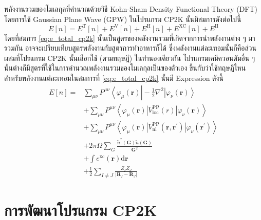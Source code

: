 พลังงานรวมของโมเลกุลที่คำนวณด้วยวิธี Kohn-Sham Density Functional Theory (DFT) โดยการใช้ Gaussian Plane Wave (GPW) ในโปรแกรม CP2K นั้นมีสมการดังต่อไปนี้
%
\begin{equation} 
    \label{eq:e_total_cp2k}
    E[n] 
    = 
    E^{\mathrm{T}}[n]
    + E^{\mathrm{V}}[n] 
    + E^{\mathrm{H}}[n]
    + E^{\mathrm{XC}}[n]
    + E^{\mathrm{II}}
\end{equation}
%
โดยที่สมการ \eqref{eq:e_total_cp2k} นั้นเป็นสูตรของพลังงานรวมที่เกิดจากการนำพลังงานต่าง ๆ มารวมกัน อาจจะเปรียบเทียบสูตรพลังงานกับสูตรการทำอาหารก็ได้ ซึ่งพลังงานแต่ละเทอมนั้นก็คือส่วนผสมที่โปรแกรม CP2K นั้นเลือกใช้ (ตามทฤษฎี) ในทำนองเดียวกัน โปรแกรมเคมีควอนตัมอื่น ๆ นั้นต่างก็มีสูตรที่ใช้ในการคำนวณพลังงานรวมของโมเลกุลเป็นของตัวเอง ขึ้นกับว่าใช้ทฤษฎีไหน สำหรับพลังงานแต่ละเทอมในสมการที่ \eqref{eq:e_total_cp2k} นั้นมี Expression ดังนี้
%
\begin{align}
    \label{eq:e_total_cp2k_full}
    E[n] 
    =&
    \sum_{\mu \nu} P^{\mu \nu}\left\langle\varphi_\mu(\boldsymbol{r})\right| \nonumber
    - \frac{1}{2} \nabla^2\left|\varphi_\nu(\boldsymbol{r})\right\rangle \nonumber \\
    &+ \sum_{\mu \nu} P^{\mu \nu}\left\langle\varphi_\mu(\boldsymbol{r})
    \left|V_{\mathrm{loc}}^{\mathrm{PP}}(r)\right| 
    \varphi_\nu(\boldsymbol{r})\right\rangle \nonumber \\
    &+ \sum_{\mu \nu} P^{\mu \nu}\left\langle\varphi_\mu(\boldsymbol{r})
    \left|V_{\mathrm{nl}}^{\mathrm{PP}}\left(\boldsymbol{r}, \boldsymbol{r}^{\prime}\right)\right| 
    \varphi_\nu\left(\boldsymbol{r}^{\prime}\right)\right\rangle \nonumber \\ 
    &+ 2 \pi \Omega \sum_G \frac{\widetilde{n}^*(\boldsymbol{G}) \tilde{n}(\boldsymbol{G})}{\boldsymbol{G}^2} \nonumber \\ 
    &+ \int e^{\mathrm{xc}}(\boldsymbol{r}) \mathrm{d} \boldsymbol{r} \nonumber \\ 
    &+ \frac{1}{2} \sum_{I \neq J} \frac{Z_I Z_J}{\left|\boldsymbol{R}_I-\boldsymbol{R}_J\right|}
\end{align}

\section{การพัฒนาโปรแกรม CP2K}

